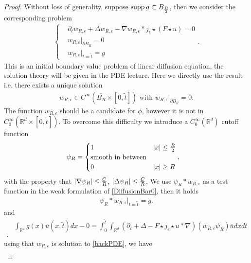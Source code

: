 \begin{proof}
Without loss of generality, suppose $\operatorname*{supp} g \subset  B_{\frac{R}{2}}$, then we consider the corresponding problem 
\begin{align}\label{backPDE}
  \begin{cases}
    &\partial_t w_{R,\epsilon} + \Delta w_{R,\epsilon} -\nabla w_{R,\epsilon} * j_{\epsilon} \star  (F \star  u) = 0\\
    &w_{R,\epsilon} \rvert_{\partial B_{R}} =  0\\
    &w_{R,\epsilon} \rvert_{t = \tilde{t} }  = g
  \end{cases}
.\end{align}
This is an initial boundary value problem of linear diffusion equation, the solution theory will be given in the PDE lecture. Here we directly use the result i.e.
there exists a unique solution 
\begin{align*}
  w_{R,\epsilon} \in  C^{\infty}(\overline{B_R} \times  [0,\tilde{t} ] ) \text{ with } w_{R,\epsilon} \rvert_{\partial B_R} = 0
.\end{align*}
The function $w_{R,\epsilon}$ should be a candidate  for $\phi $, however it is not in $C_0^{\infty}(\mathbb{R}^{d} \times  [0,\tilde{t} ] ) $. 
To overcome this difficulty we introduce a $C_0^{\infty}(\mathbb{R}^{d} )$ cutoff function  
\begin{align*}
    \psi_{R} &=  \begin{cases}
      1 &\lvert x\rvert \le \frac{R}{2}\\
      \text{smooth in between} & \\
      0 &\lvert x\rvert \ge R
    \end{cases}   
,\end{align*}
with the property that $ \lvert\nabla \psi_R\rvert \le \frac{C}{R} $, $\lvert\Delta  \psi_R\rvert \le \frac{C}{R}$.
We use $\psi_R * w_{R,\epsilon}$ as a test function in the weak formulation of \autoref{DiffusionBar0}, then it holds
\begin{align*}
  \psi_{R}*w_{R,\epsilon} \rvert_{t = \tilde{t} } = g
.\end{align*}
and 
\begin{align*}
  &\int_{\mathbb{R}^{d} } g(x)\overline{u}(x,\tilde{t} )dx - 0 = \int_0^{\tilde{t} } \int_{\mathbb{R}^{d} }  (\partial_t  + \Delta -  F \star  j_{\epsilon} \star u * \nabla)(w_{R,\epsilon} \psi_R) \overline{u}dxdt\\
.\end{align*}
using that $w_{R,\epsilon}$ is solution to \autoref{backPDE}, we have
\begin{align*}

\end{align*}
\end{proof}
